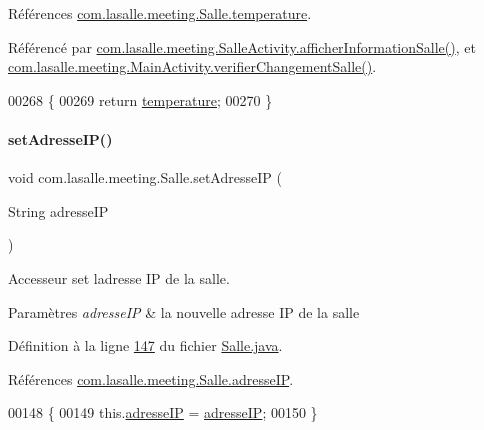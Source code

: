 Références \hyperlink{_salle_8java_source_l00040}{com.\+lasalle.\+meeting.\+Salle.\+temperature}.



Référencé par \hyperlink{_salle_activity_8java_source_l00103}{com.\+lasalle.\+meeting.\+Salle\+Activity.\+afficher\+Information\+Salle()}, et \hyperlink{_main_activity_8java_source_l00291}{com.\+lasalle.\+meeting.\+Main\+Activity.\+verifier\+Changement\+Salle()}.


\begin{DoxyCode}
00268     \{
00269         \textcolor{keywordflow}{return} \hyperlink{classcom_1_1lasalle_1_1meeting_1_1_salle_a31600559f77e2eeb1f6aa150b203213e}{temperature};
00270     \}
\end{DoxyCode}
\mbox{\label{classcom_1_1lasalle_1_1meeting_1_1_salle_a87125e2e3060bc3d1582dafbdef7b65e}} 
\paragraph{\texorpdfstring{set\+Adresse\+I\+P()}{setAdresseIP()}}
{\footnotesize\ttfamily void com.\+lasalle.\+meeting.\+Salle.\+set\+Adresse\+IP (\begin{DoxyParamCaption}\item[{String}]{adresse\+IP }\end{DoxyParamCaption})}



Accesseur set l\textquotesingle{}adresse IP de la salle. 


\begin{DoxyParams}{Paramètres}
{\em adresse\+IP} & la nouvelle adresse IP de la salle \\
\hline
\end{DoxyParams}


Définition à la ligne \hyperlink{_salle_8java_source_l00147}{147} du fichier \hyperlink{_salle_8java_source}{Salle.\+java}.



Références \hyperlink{_salle_8java_source_l00041}{com.\+lasalle.\+meeting.\+Salle.\+adresse\+IP}.


\begin{DoxyCode}
00148     \{
00149         this.\hyperlink{classcom_1_1lasalle_1_1meeting_1_1_salle_ad83f4f49123c8d02f2fc0da484d3e812}{adresseIP} = \hyperlink{classcom_1_1lasalle_1_1meeting_1_1_salle_ad83f4f49123c8d02f2fc0da484d3e812}{adresseIP};
00150     \}
\end{DoxyCode}
\mbox{\label{classcom_1_1lasalle_1_1meeting_1_1_salle_a30986392165b34765e4325f669cc5ece}} 
